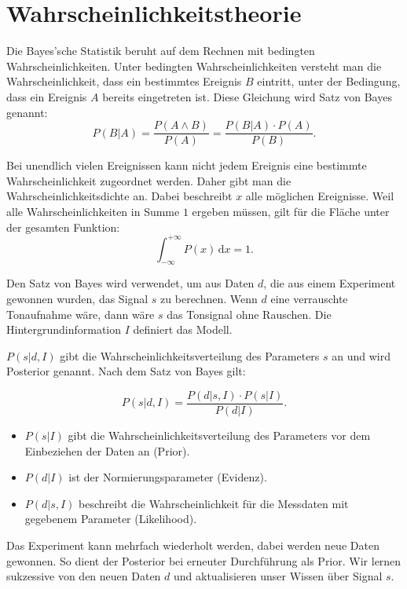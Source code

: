 \section{Wahrscheinlichkeitstheorie}\label{k4.2.bayes}

Die Bayes'sche Statistik beruht auf dem Rechnen mit bedingten Wahrscheinlichkeiten. Unter bedingten Wahrscheinlichkeiten versteht man die Wahrscheinlichkeit, dass ein bestimmtes Ereignis $B$ eintritt, unter der Bedingung, dass ein Ereignis $A$ bereits eingetreten ist. Diese Gleichung wird Satz von Bayes genannt:
\begin{equation}
P(B|A) = \frac{P(A \wedge B)}{P(A)} = \frac{P(B|A)\cdot P(A)}{P(B)}.
\end{equation}

Bei unendlich vielen Ereignissen kann nicht jedem Ereignis eine bestimmte Wahrscheinlichkeit zugeordnet werden. Daher gibt man die Wahrscheinlichkeitsdichte an. Dabei beschreibt $x$ alle möglichen Ereignisse. Weil alle Wahrscheinlichkeiten in Summe $1$ ergeben müssen, gilt für die Fläche unter der gesamten Funktion:
\begin{equation}
\int_{- \infty }^ {+ \infty} P(x) \,\mbox{d}x = 1.
\end{equation}

Den Satz von Bayes wird verwendet, um aus Daten $d$, die aus einem Experiment gewonnen wurden, das Signal $s$ zu berechnen. Wenn $d$ eine verrauschte Tonaufnahme wäre, dann wäre $s$ das Tonsignal ohne Rauschen. Die Hintergrundinformation $I$ definiert das Modell. 


 
 $P(s|d,I)$ gibt die Wahrscheinlichkeitsverteilung des Parameters $s$ an und wird Posterior genannt. Nach dem Satz von Bayes gilt:
 
\begin{equation}
P(s|d,I) = \frac{P(d|s,I)\cdot P(s|I)}{P(d|I)}.
\end{equation}

\begin{itemize}
 \item $P(s|I)$ gibt die Wahrscheinlichkeitsverteilung des Parameters vor dem Einbeziehen der Daten an (Prior).
 \item $P(d|I)$ ist der Normierungsparameter (Evidenz).
 \item $P(d|s,I)$ beschreibt die Wahrscheinlichkeit für die Messdaten mit gegebenem Parameter (Likelihood).
\end{itemize}

Das Experiment kann mehrfach wiederholt werden, dabei werden neue Daten gewonnen. So dient der Posterior bei erneuter Durchführung als Prior. Wir lernen sukzessive von den neuen Daten $d$ und aktualisieren unser Wissen über Signal $s$.